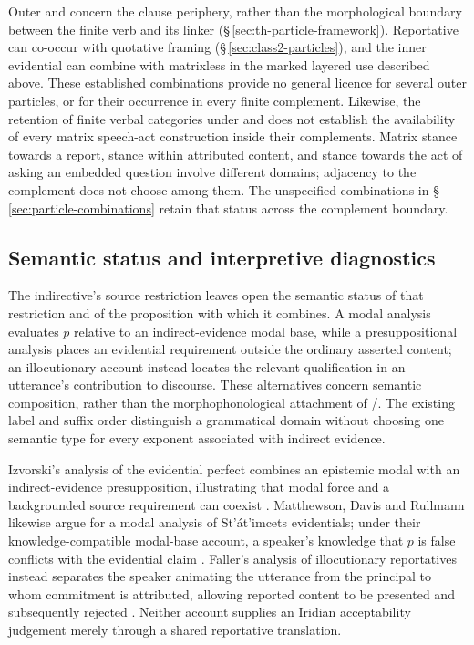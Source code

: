Outer  and  concern the clause
periphery, rather than the morphological boundary between the finite verb
and its linker (§\,\ref{sec:th-particle-framework}). Reportative
 can co-occur with quotative framing
(§\,\ref{sec:class2-particles}), and the inner evidential can combine
with matrixless  in the marked layered use described above.
These established combinations provide no general licence for several
outer particles, or for their occurrence in every finite complement.
Likewise, the retention of finite verbal categories under  and
 does not establish the availability of every matrix
speech-act construction inside their complements. Matrix stance towards a
report, stance within attributed content, and stance towards the act of
asking an embedded question involve different domains; adjacency to the
complement does not choose among them. The unspecified combinations in
§\,\ref{sec:particle-combinations} retain that status across the
complement boundary.

\subsection{Semantic status and interpretive diagnostics}
\label{sec:evidential-semantic-diagnostics}

The indirective's source restriction leaves open the semantic status of
that restriction and of the proposition with which it combines. A modal
analysis evaluates $p$ relative to an indirect-evidence modal base, while
a presuppositional analysis places an evidential requirement outside the
ordinary asserted content; an illocutionary account instead locates the
relevant qualification in an utterance's contribution to discourse.
These alternatives concern semantic composition, rather than the
morphophonological attachment of /. The existing
 label and suffix order distinguish a grammatical domain
without choosing one semantic type for every exponent associated with
indirect evidence.

Izvorski's analysis of the evidential perfect combines an epistemic modal
with an indirect-evidence presupposition, illustrating that modal force
and a backgrounded source requirement can coexist
\cite[§§1--3]{izvorski1997}. Matthewson, Davis and Rullmann likewise
argue for a modal analysis of St'át'imcets evidentials; under their
knowledge-compatible modal-base account, a speaker's knowledge that $p$
is false conflicts with the evidential claim
\cite[§4.1.1]{matthewsondavisrullmann2007}. Faller's analysis of
illocutionary reportatives instead separates the speaker animating the
utterance from the principal to whom commitment is attributed, allowing
reported content to be presented and subsequently rejected
\cite[§§5--6]{faller2019}. Neither account supplies an Iridian
acceptability judgement merely through a shared reportative translation.

